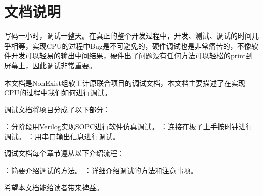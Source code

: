 \chapter{文档说明}

写码一小时，调试一整天。在真正的整个开发过程中，开发、测试、调试的时间几乎相等，实现CPU的过程中Bug是不可避免的，硬件调试也是非常痛苦的，不像软件开发可以轻易的输出中间结果，硬件出了问题没有任何方法可以轻松的print到屏幕上，因此调试非常重要。

本文档是NonExist组软工计原联合项目的调试文档，本文档主要描述了在实现CPU的过程中我们如何进行调试。

调试文档将项目分成了以下部分：

    \begin{enumerate}
        ：分阶段用Verilog实现SOPC进行软件仿真调试。
        ：连接在板子上手按时钟进行调试。
        ：用串口输出信息进行调试。
    \end{enumerate}


调试文档每个章节遵从以下介绍流程：

    \begin{enumerate}
        ：简要介绍调试的方法。
        ：详细介绍调试的方法和注意事项。
    \end{enumerate}

希望本文档能给读者带来裨益。
